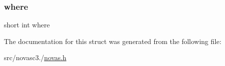 \mbox{\label{structobserver_a62444ffa161301201c9ed5b4a5deee4b}} 
\subsubsection{\texorpdfstring{where}{where}}
{\footnotesize\ttfamily short int where}



The documentation for this struct was generated from the following file\+:\begin{DoxyCompactItemize}
\item 
src/novasc3./\mbox{\hyperlink{novas_8h}{novas.\+h}}\end{DoxyCompactItemize}
